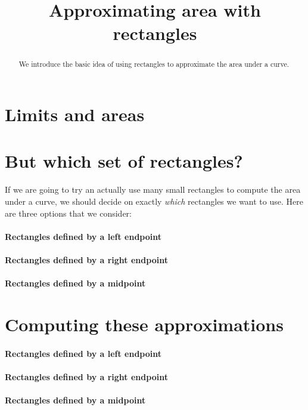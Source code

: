 \documentclass{ximera}
\title[Dig-In:]{Approximating area with rectangles}
\begin{document}
\begin{abstract}
  We introduce the basic idea of using rectangles to approximate the
  area under a curve.
\end{abstract}
\maketitle

\section{Limits and areas}





\section{But which set of rectangles?}

If we are going to try an actually use many small rectangles to
compute the area under a curve, we should decide on exactly
\textit{which} rectangles we want to use. Here are three options that
we consider:

\paragraph{Rectangles defined by a left endpoint}


\paragraph{Rectangles defined by a right endpoint}


\paragraph{Rectangles defined by a midpoint}


\section{Computing these approximations}


\paragraph{Rectangles defined by a left endpoint}


\paragraph{Rectangles defined by a right endpoint}


\paragraph{Rectangles defined by a midpoint}
\end{document}
